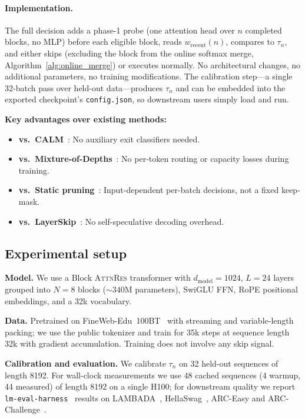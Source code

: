 \documentclass{article}
\newcommand{\attnres}{\textsc{AttnRes}}
\begin{document}
\paragraph{Implementation.}
The full decision adds a phase-1 probe (one attention head over $n$ completed blocks, no MLP) before each eligible block, reads $w_{\text{recent}}(n)$, compares to $\tau_n$, and either skips (excluding the block from the online softmax merge, Algorithm~\ref{alg:online_merge}) or executes normally. No architectural changes, no additional parameters, no training modifications. The calibration step---a single 32-batch pass over held-out data---produces $\tau_n$ and can be embedded into the exported checkpoint's \texttt{config.json}, so downstream users simply load and run.

\textbf{Key advantages over existing methods:}
\begin{itemize}
    \item \textbf{vs.\ CALM}~\citep{schuster2022confident}: No auxiliary exit classifiers needed.
    \item \textbf{vs.\ Mixture-of-Depths}~\citep{raposo2024mixture}: No per-token routing or capacity losses during training.
    \item \textbf{vs.\ Static pruning}~\citep{gromov2024unreasonable}: Input-dependent per-batch decisions, not a fixed keep-mask.
    \item \textbf{vs.\ LayerSkip}~\citep{elhoushi2024layerskip}: No self-speculative decoding overhead.
\end{itemize}

\subsection{Experimental setup}
\label{sec:reskip_setup}

\textbf{Model.} We use a Block \attnres{} transformer with $d_{\text{model}}{=}1024$, $L{=}24$ layers grouped into $N{=}8$ blocks (${\sim}340$M parameters), SwiGLU FFN, RoPE positional embeddings, and a 32k vocabulary.

\textbf{Data.} Pretrained on FineWeb-Edu~100BT~\citep{penedo2024fineweb} with streaming and variable-length packing; we use the public tokenizer and train for 35k steps at sequence length 32k with gradient accumulation. Training does not involve any skip signal.

\textbf{Calibration and evaluation.} We calibrate $\tau_n$ on 32 held-out sequences of length 8192. For wall-clock measurements we use 48 cached sequences (4 warmup, 44 measured) of length 8192 on a single H100; for downstream quality we report \texttt{lm-eval-harness}~\citep{eval-harness} results on LAMBADA~\citep{paperno2016lambada}, HellaSwag~\citep{zellers2019hellaswag}, ARC-Easy and ARC-Challenge~\citep{clark2018arc}.
\end{document}
